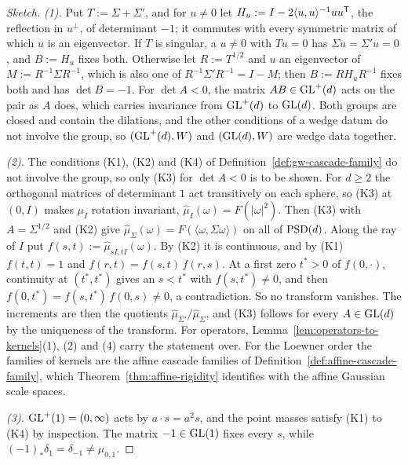 \begin{proof}[Sketch]
\emph{(1).} Put $T := \Sigma + \Sigma'$, and for $u \ne 0$ let
$H_u := I - 2\langle u, u\rangle^{-1}uu^{\mathsf{T}}$, the reflection in $u^\perp$, of determinant $-1$; it
commutes with every symmetric matrix of which $u$ is an eigenvector. If $T$ is singular, a $u \ne 0$
with $Tu = 0$ has $\Sigma u = \Sigma'u = 0$, and $B := H_u$ fixes both. Otherwise let $R := T^{1/2}$
and $u$ an eigenvector of $M := R^{-1}\Sigma R^{-1}$, which is also one of $R^{-1}\Sigma'R^{-1} = I - M$;
then $B := RH_uR^{-1}$ fixes both and has $\det B = -1$. For $\det A < 0$, the matrix
$AB \in \mathrm{GL}^+(d)$ acts on the pair as $A$ does, which
carries invariance from $\mathrm{GL}^+(d)$ to $\mathrm{GL}(d)$. Both groups are closed and contain the dilations, and
the other conditions of a wedge datum do not involve the group, so $(\mathrm{GL}^+(d), W)$ and $(\mathrm{GL}(d), W)$
are wedge data together.

\emph{(2).} The conditions (K1), (K2) and (K4) of Definition~\ref{def:gw-cascade-family} do not
involve the group, so only (K3) for $\det A < 0$ is to be shown. For $d \ge 2$ the orthogonal
matrices of determinant $1$ act transitively on each sphere, so (K3) at $(0, I)$ makes $\mu_I$
rotation invariant, $\widehat\mu_I(\omega) = F(|\omega|^2)$. Then (K3) with $A = \Sigma^{1/2}$ and (K2) give
$\widehat\mu_\Sigma(\omega) = F(\langle\omega,\Sigma\omega\rangle)$ on all of $\mathrm{PSD}(d)$. Along the ray of
$I$ put $f(s,t) := \widehat\mu_{sI,tI}(\omega)$. By (K2) it is continuous, and by (K1) $f(t,t) = 1$ and
$f(r,t) = f(s,t)\,f(r,s)$. At a first zero $t^* > 0$ of $f(0,\cdot)$, continuity at $(t^*,t^*)$ gives an
$s < t^*$ with $f(s,t^*) \ne 0$, and then $f(0,t^*) = f(s,t^*)\,f(0,s) \ne 0$, a contradiction. So no
transform vanishes. The increments are then the quotients $\widehat\mu_{\Sigma'}/\widehat\mu_\Sigma$,
and (K3) follows for every $A \in \mathrm{GL}(d)$ by the uniqueness of the transform. For operators,
Lemma~\ref{lem:operators-to-kernels}(1), (2) and (4) carry the statement over. For the Loewner order
the families of kernels are the affine cascade families of
Definition~\ref{def:affine-cascade-family}, which Theorem~\ref{thm:affine-rigidity} identifies with
the affine Gaussian scale spaces.

\emph{(3).} $\mathrm{GL}^+(1) = (0, \infty)$ acts by $a \cdot s = a^2s$, and the point masses satisfy (K1)
to (K4) by inspection. The matrix $-1 \in \mathrm{GL}(1)$ fixes every $s$, while
$(-1)_*\delta_1 = \delta_{-1} \ne \mu_{0,1}$.
\end{proof}
